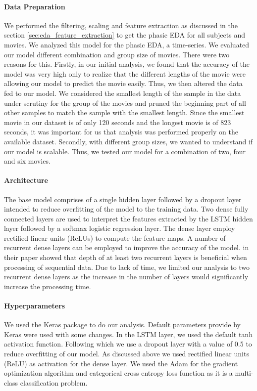 \paragraph{Data Preparation}

We performed the filtering, scaling and feature extraction as discussed in the section \ref{sec:eda_feature_extraction} to get the phasic EDA for all subjects and movies. We analyzed this model for the phasic EDA, a time-series. We evaluated our model different combination and group size of movies. There were two reasons for this. Firstly, in our initial analysis, we found that the accuracy of the model was very high only to realize that the different lengths of the movie were allowing our model to predict the movie easily. Thus, we then altered the data fed to our model. We considered the smallest length of the sample in the data under scrutiny for the group of the movies and pruned the beginning part of all other samples to match the sample with the smallest length. Since the smallest movie in our dataset is of only 120 seconds and the longest movie is of 823 seconds, it was important for us that analysis was performed properly on the available dataset. Secondly, with different group sizes, we wanted to understand if our model is scalable. Thus, we tested our model for a combination of two, four and six movies. 

\paragraph{Architecture} The base model comprises of a single hidden layer followed by a dropout layer intended to reduce overfitting of the model to the training data. Two dense fully connected layers are used to interpret the features extracted by the LSTM hidden layer followed by a softmax logistic regression layer. The dense layer employ rectified linear units (ReLUs) to compute the feature maps. A number of recurrent dense layers can be employed to improve the accuracy of the model. \citeauthor{karpathy_visualizing_2015} in their paper showed that depth of at least two recurrent layers is beneficial when processing of sequential data. Due to lack of time, we limited our analysis to two recurrent dense layers as the increase in the number of layers would significantly increase the processing time. 

\paragraph{Hyperparameters} We used the Keras \cite{keras} package to do our analysis. Default parameters provide by Keras were used with some changes. In the LSTM layer, we used the default tanh activation function. Following which we use a dropout layer with a value of 0.5 to reduce overfitting of our model. As discussed above we used rectified linear units (ReLU) as activation for the dense layer. We used the Adam for the gradient optimization algorithm \cite{kingma_adam:_2014} and categorical cross entropy loss function as it is a multi-class classification problem. 

